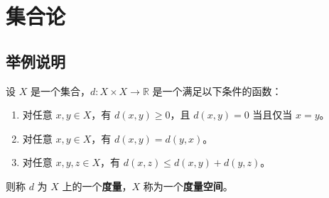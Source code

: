 \documentclass[12pt, a4paper, oneside, UTF8]{ctexbook}
\begin{document}
	\else
	\fi
	
	\chapter{集合论}
	
	\section{举例说明}
	
	\begin{defn}
		设 $X$ 是一个集合，$d: X \times X \to \mathbb{R}$ 是一个满足以下条件的函数：
		\begin{enumerate}
			\item 对任意 $x, y \in X$，有 $d(x, y) \geq 0$，且 $d(x, y) = 0$ 当且仅当 $x = y$。
			\item 对任意 $x, y \in X$，有 $d(x, y) = d(y, x)$。
			\item 对任意 $x, y, z \in X$，有 $d(x, z) \leq d(x, y) + d(y, z)$。
		\end{enumerate}
		则称 $d$ 为 $X$ 上的一个\textbf{度量}，$X$ 称为一个\textbf{度量空间}。
	\end{defn}
	
	\ifx\allfiles\undefined
\end{document}
